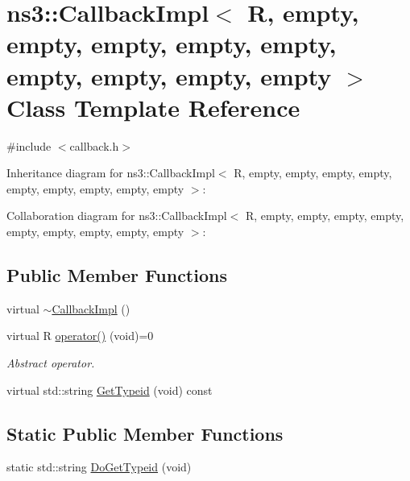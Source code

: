 \hypertarget{classns3_1_1CallbackImpl_3_01R_00_01empty_00_01empty_00_01empty_00_01empty_00_01empty_00_01empty95b014f95428197cb51aac9872e394ba}{}\section{ns3\+:\+:Callback\+Impl$<$ R, empty, empty, empty, empty, empty, empty, empty, empty, empty $>$ Class Template Reference}
\label{classns3_1_1CallbackImpl_3_01R_00_01empty_00_01empty_00_01empty_00_01empty_00_01empty_00_01empty95b014f95428197cb51aac9872e394ba}


{\ttfamily \#include $<$callback.\+h$>$}



Inheritance diagram for ns3\+:\+:Callback\+Impl$<$ R, empty, empty, empty, empty, empty, empty, empty, empty, empty $>$\+:


Collaboration diagram for ns3\+:\+:Callback\+Impl$<$ R, empty, empty, empty, empty, empty, empty, empty, empty, empty $>$\+:
\subsection*{Public Member Functions}
\begin{DoxyCompactItemize}
\item 
virtual \hyperlink{classns3_1_1CallbackImpl_3_01R_00_01empty_00_01empty_00_01empty_00_01empty_00_01empty_00_01empty95b014f95428197cb51aac9872e394ba_a99d2e22a444a46ef48fba02810e359ec}{$\sim$\+Callback\+Impl} ()
\item 
virtual R \hyperlink{classns3_1_1CallbackImpl_3_01R_00_01empty_00_01empty_00_01empty_00_01empty_00_01empty_00_01empty95b014f95428197cb51aac9872e394ba_af0582f8941c97d57623ee2b42993bd85}{operator()} (void)=0
\begin{DoxyCompactList}\small\item\em Abstract operator. \end{DoxyCompactList}\item 
virtual std\+::string \hyperlink{classns3_1_1CallbackImpl_3_01R_00_01empty_00_01empty_00_01empty_00_01empty_00_01empty_00_01empty95b014f95428197cb51aac9872e394ba_aa3c3a09b20e357170b42dfb2ae9abe91}{Get\+Typeid} (void) const 
\end{DoxyCompactItemize}
\subsection*{Static Public Member Functions}
\begin{DoxyCompactItemize}
\item 
static std\+::string \hyperlink{classns3_1_1CallbackImpl_3_01R_00_01empty_00_01empty_00_01empty_00_01empty_00_01empty_00_01empty95b014f95428197cb51aac9872e394ba_ad297589037b791a5d6bd3bede98a5baa}{Do\+Get\+Typeid} (void)
\end{DoxyCompactItemize}
